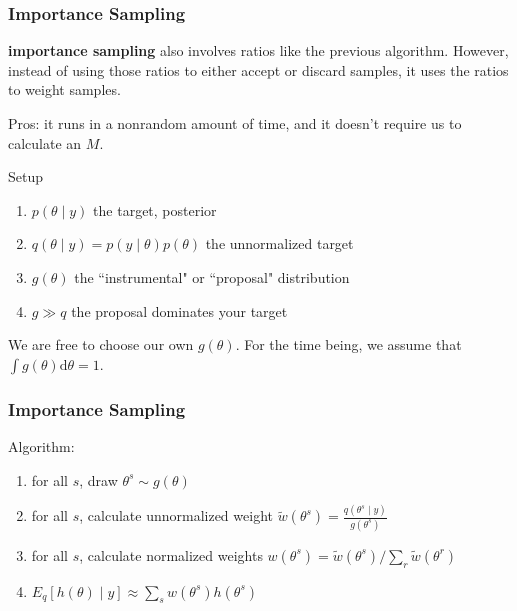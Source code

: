 \documentclass{beamer}
\begin{document}
\begin{frame}[fragile]
\frametitle{Importance Sampling}

{\bf importance sampling} also involves ratios like the previous algorithm. However, instead of using those ratios to either accept or discard samples, it uses the ratios to weight samples. 
\newline

Pros: it runs in a nonrandom amount of time, and it doesn't require us to calculate an $M$. 
\newline
\pause

Setup
\begin{enumerate}
\item $p(\theta \mid y)$ the target, posterior
\item $q(\theta \mid y) = p(y \mid \theta) p(\theta)$ the unnormalized target
\item $g(\theta)$ the ``instrumental" or ``proposal" distribution
\item $g \gg q$ the proposal dominates your target 
\end{enumerate}
We are free to choose our own $g(\theta)$. For the time being, we assume that $\int g(\theta) \text{d}\theta = 1$.


\end{frame}
\begin{frame}[fragile]
\frametitle{Importance Sampling}

Algorithm:
\begin{enumerate}
\item for all $s$, draw $\theta^s \sim g(\theta)$
\item for all $s$, calculate unnormalized weight $\tilde{w}(\theta^s) = \frac{q(\theta^s \mid y)}{g(\theta^s)}$
\item for all $s$, calculate normalized weights $w(\theta^s) = \tilde{w}(\theta^s)/\sum_r \tilde{w}(\theta^r)$
\item $E_q[h(\theta) \mid y] \approx \sum_s w(\theta^s) h(\theta^s)$
\end{enumerate}

\end{frame}
\end{document}
